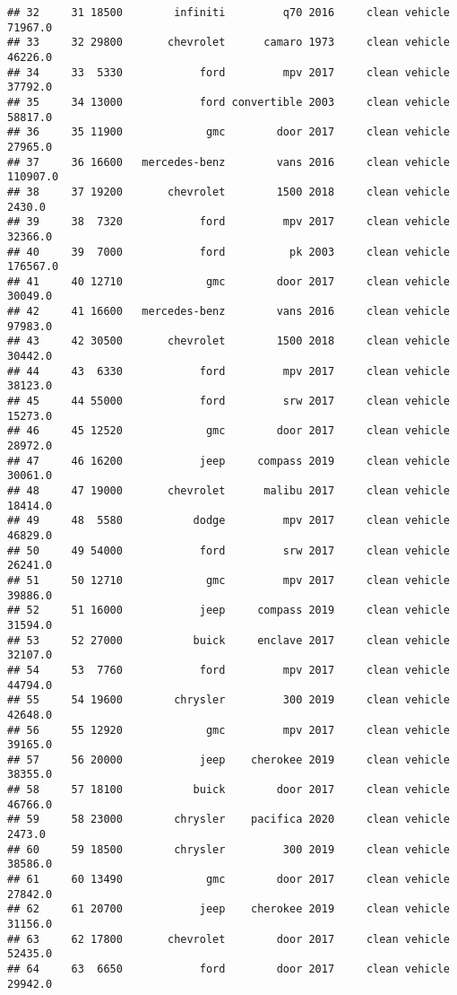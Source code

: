 \documentclass[
]{article}
\begin{document}
\begin{verbatim}
## 32     31 18500        infiniti         q70 2016     clean vehicle   71967.0
## 33     32 29800       chevrolet      camaro 1973     clean vehicle   46226.0
## 34     33  5330            ford         mpv 2017     clean vehicle   37792.0
## 35     34 13000            ford convertible 2003     clean vehicle   58817.0
## 36     35 11900             gmc        door 2017     clean vehicle   27965.0
## 37     36 16600   mercedes-benz        vans 2016     clean vehicle  110907.0
## 38     37 19200       chevrolet        1500 2018     clean vehicle    2430.0
## 39     38  7320            ford         mpv 2017     clean vehicle   32366.0
## 40     39  7000            ford          pk 2003     clean vehicle  176567.0
## 41     40 12710             gmc        door 2017     clean vehicle   30049.0
## 42     41 16600   mercedes-benz        vans 2016     clean vehicle   97983.0
## 43     42 30500       chevrolet        1500 2018     clean vehicle   30442.0
## 44     43  6330            ford         mpv 2017     clean vehicle   38123.0
## 45     44 55000            ford         srw 2017     clean vehicle   15273.0
## 46     45 12520             gmc        door 2017     clean vehicle   28972.0
## 47     46 16200            jeep     compass 2019     clean vehicle   30061.0
## 48     47 19000       chevrolet      malibu 2017     clean vehicle   18414.0
## 49     48  5580           dodge         mpv 2017     clean vehicle   46829.0
## 50     49 54000            ford         srw 2017     clean vehicle   26241.0
## 51     50 12710             gmc         mpv 2017     clean vehicle   39886.0
## 52     51 16000            jeep     compass 2019     clean vehicle   31594.0
## 53     52 27000           buick     enclave 2017     clean vehicle   32107.0
## 54     53  7760            ford         mpv 2017     clean vehicle   44794.0
## 55     54 19600        chrysler         300 2019     clean vehicle   42648.0
## 56     55 12920             gmc         mpv 2017     clean vehicle   39165.0
## 57     56 20000            jeep    cherokee 2019     clean vehicle   38355.0
## 58     57 18100           buick        door 2017     clean vehicle   46766.0
## 59     58 23000        chrysler    pacifica 2020     clean vehicle    2473.0
## 60     59 18500        chrysler         300 2019     clean vehicle   38586.0
## 61     60 13490             gmc        door 2017     clean vehicle   27842.0
## 62     61 20700            jeep    cherokee 2019     clean vehicle   31156.0
## 63     62 17800       chevrolet        door 2017     clean vehicle   52435.0
## 64     63  6650            ford        door 2017     clean vehicle   29942.0

\end{verbatim}
\end{document}
